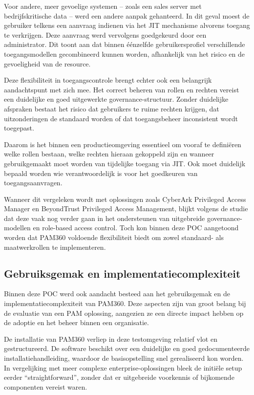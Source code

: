 Voor andere, meer gevoelige systemen – zoals een sales server met bedrijfskritische data – werd een andere aanpak gehanteerd. In dit geval moest de gebruiker telkens een aanvraag indienen via het JIT mechanisme alvorens toegang te verkrijgen. Deze aanvraag werd vervolgens goedgekeurd door een administrator. Dit toont aan dat binnen éénzelfde gebruikersprofiel verschillende toegangsmodellen gecombineerd kunnen worden, afhankelijk van het risico en de gevoeligheid van de resource.

Deze flexibiliteit in toegangscontrole brengt echter ook een belangrijk aandachtspunt met zich mee. Het correct beheren van rollen en rechten vereist een duidelijke en goed uitgewerkte governance-structuur. Zonder duidelijke afspraken bestaat het risico dat gebruikers te ruime rechten krijgen, dat uitzonderingen de standaard worden of dat toegangsbeheer inconsistent wordt toegepast.

Daarom is het binnen een productieomgeving essentieel om vooraf te definiëren welke rollen bestaan, welke rechten hieraan gekoppeld zijn en wanneer gebruikgemaakt moet worden van tijdelijke toegang via JIT. Ook moet duidelijk bepaald worden wie verantwoordelijk is voor het goedkeuren van toegangsaanvragen.

Wanneer dit vergeleken wordt met oplossingen zoals CyberArk Privileged Access Manager en BeyondTrust Privileged Access Management, blijkt volgens de studie dat deze vaak nog verder gaan in het ondersteunen van uitgebreide governance-modellen en role-based access control. Toch kon binnen deze POC aangetoond worden dat PAM360 voldoende flexibiliteit biedt om zowel standaard- als maatwerkrollen te implementeren.

\subsection{Gebruiksgemak en implementatiecomplexiteit}
Binnen deze POC werd ook aandacht besteed aan het gebruiksgemak en de implementatiecomplexiteit van PAM360. Deze aspecten zijn van groot belang bij de evaluatie van een PAM oplossing, aangezien ze een directe impact hebben op de adoptie en het beheer binnen een organisatie.

De installatie van PAM360 verliep in deze testomgeving relatief vlot en gestructureerd. De software beschikt over een duidelijke en goed gedocumenteerde installatiehandleiding, waardoor de basisopstelling snel gerealiseerd kon worden. In vergelijking met meer complexe enterprise-oplossingen bleek de initiële setup eerder “straightforward”, zonder dat er uitgebreide voorkennis of bijkomende componenten vereist waren.

